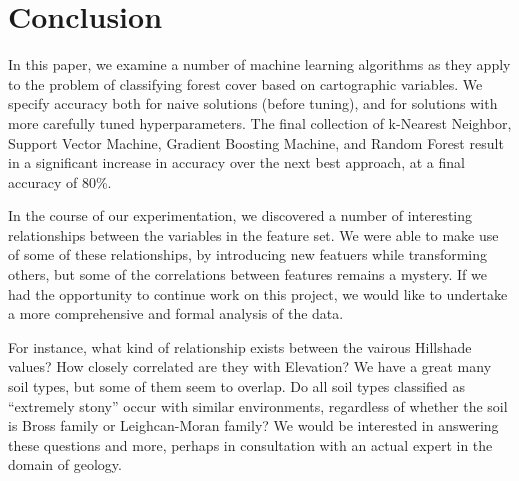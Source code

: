 \section{Conclusion}
\label{sec:-conc}

In this paper, we examine a number of machine learning algorithms as 
they apply to the problem of classifying forest cover based on 
cartographic variables.  We specify accuracy both for naive solutions 
(before tuning), and for solutions with more carefully tuned 
hyperparameters.  The final collection of k-Nearest Neighbor, Support 
Vector Machine, Gradient Boosting Machine, and Random Forest result in 
a significant increase in accuracy over the next best approach, at a 
final accuracy of 80\%.

In the course of our experimentation, we discovered a number of 
interesting relationships between the variables in the feature set.  
We were able to make use of some of these relationships, by introducing 
new featuers while transforming others, but some of the correlations 
between features remains a mystery. If we had the opportunity to 
continue work on this project, we would like to undertake a more 
comprehensive and formal analysis of the data.  

For instance, what 
kind of relationship exists between the vairous Hillshade values?  
How closely correlated are they with Elevation?  We have a great 
many soil types, but some of them seem to overlap. Do all soil types 
classified as ``extremely stony'' occur with similar environments, 
regardless of whether the soil is Bross family or Leighcan-Moran family?  
We would be interested in answering these questions and more, perhaps 
in consultation with an actual expert in the domain of geology.






